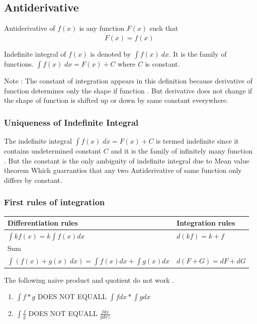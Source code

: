 \subsection{Antiderivative} 

\begin{definition*}
Antiderivative of $f(x)$ is any function $F(x)$ such that 
    \begin{equation*}
        \dot{F}(x) = f(x)
    \end{equation*}
\end{definition*}
Indefinite integral of $f(x)$ is denoted by $\int f(x)\: dx$. It is 
the family of functions. $\int f(x)\; dx = F(x) + C $  where $C$ is 
constant. 

Note : The constant of integration appears in this definition because 
derivative of function determines only the shape if function . But derivative does not change if the shape of function is shifted up or down by same
constant everywhere. 

\subsubsection{Uniqueness of Indefinite Integral}
The indefinite integral $\int f(x) \; dx = F(x) + C$ is termed indefinite
since it contains undetermined constant $C$ and it is the family of 
infinitely many function . But the constant is the only ambiguity of 
indefinite integral due to Mean value theorem Which guarranties that any
two Antiderivative of same function only differs by constant. 

\subsubsection{First rules of integration} 
\begin{tabular}{ll}
    \toprule 
    Differentiation rules & Integration rules \\
    \midrule
    $\int k f(x) = k \int f(x) dx$ & $d(kf) = k + f$ \\
    Sum \\
    $\int (f(x)+g(x)\; dx) = \int f(x) dx + \int g(x) dx$ & $d(F+G) =dF + dG$
\end{tabular}

The following naive product and quotient do not work . 
\begin{enumerate}

    \item $\int f * g$ DOES NOT EQUALL $\int f dx * \int g dx$
	    \item $\int \frac{f}{g}$ DOES NOT EQUALL $\frac{f dx}{g dx)}$

\end{enumerate}

